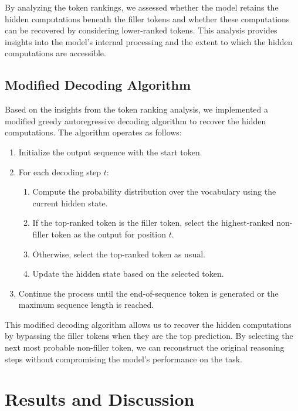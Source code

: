 \documentclass{article}
\begin{document}
By analyzing the token rankings, we assessed whether the model retains the hidden computations beneath the filler tokens and whether these computations can be recovered by considering lower-ranked tokens. This analysis provides insights into the model's internal processing and the extent to which the hidden computations are accessible.

\subsection{Modified Decoding Algorithm}
\label{ssec:Filler tokens}

Based on the insights from the token ranking analysis, we implemented a modified greedy autoregressive decoding algorithm to recover the hidden computations. The algorithm operates as follows:

\begin{enumerate}
    \item Initialize the output sequence with the start token.
    \item For each decoding step $t$:
    \begin{enumerate}
        \item Compute the probability distribution over the vocabulary using the current hidden state.
        \item If the top-ranked token is the filler token, select the highest-ranked non-filler token as the output for position $t$.
        \item Otherwise, select the top-ranked token as usual.
        \item Update the hidden state based on the selected token.
    \end{enumerate}
    \item Continue the process until the end-of-sequence token is generated or the maximum sequence length is reached.
\end{enumerate}

This modified decoding algorithm allows us to recover the hidden computations by bypassing the filler tokens when they are the top prediction. By selecting the next most probable non-filler token, we can reconstruct the original reasoning steps without compromising the model's performance on the task.

\section{Results and Discussion}
\end{document}
